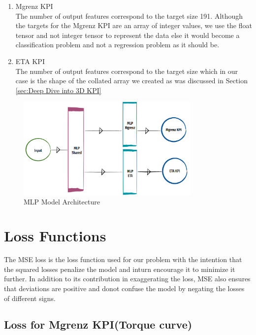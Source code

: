 \documentclass{report} %
\begin{document}
\begin{enumerate}
    \item Mgrenz \ac{KPI} \\
    The number of output features correspond to the target size 191.
    Although the targets for the Mgrenz \ac{KPI} are an array of integer values, we use the float tensor and not integer tensor to represent the data else it would become a classification problem and not a regression problem as it should be. \\
    \item ETA \ac{KPI} \\
    The number of output features correspond to the target size which in our case is the shape of the collated array we created as was discussed in Section \ref{sec:Deep Dive into 3D KPI}
\end{enumerate}

\begin{figure}[H]
    \centering
    \includegraphics[width=0.8\textwidth]{./ReportImages/mlp_architecture.png} 
    \caption{MLP Model Architecture}
    \label{fig:MLP Model Architecture}
\end{figure}

\section{Loss Functions}\label{sec:Loss Functions}
The \ac{MSE} loss is the loss function used for our problem with the intention that the squared losses penalize the model and inturn encourage it to minimize it further.
In addition to its contribution in exaggerating the loss, \ac{MSE} also ensures that deviations are positive and donot confuse the model by negating the losses of different signs. \\

\subsection{Loss for Mgrenz \ac{KPI}(Torque curve)}\label{sec:Loss for 2D KPI}
\end{document}
